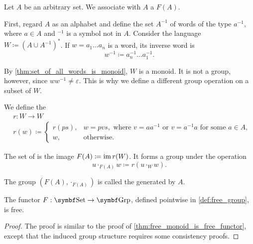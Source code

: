\begin{definition}\label{def:free_group}\cite[306]{Knapp2016BAlg}
  Let \( A \) be an arbitrary set. We associate with \( A \) a  \( F(A) \). 

  First, regard \( A \) as an alphabet and define the set \( A^{-1} \) of words of the type \( a^{-1} \), where \( a \in A \) and \( \mbox{}^{-1} \) is a symbol not in \( A \). Consider the language \( W \coloneqq (A \cup A^{-1})^{*} \). If \( w = a_1 \ldots a_n \) is a word, its inverse word is
  \begin{equation*}
    w^{-1} \coloneqq a_n^{-1} \ldots a_1^{-1}.
  \end{equation*}

  By \cref{thm:set_of_all_words_is_monoid}, \( W \) is a monoid. It is not a group, however, since \( w w^{-1} \neq \varepsilon \). This is why we define a different group operation on a subset of \( W \).

  We define the 
  \begin{align*}
    &r: W \to W \\
    &r(w) \coloneqq \begin{cases}
      r(ps), &w = pvs, \text{ where } v = aa^{-1} \text{ or } v = a^{-1}a \text{ for some } a \in A, \\
      w, &\text{otherwise}.
    \end{cases}
  \end{align*}

  The set of  is the image \( F(A) \coloneqq \operatorname{im} r(W) \). It forms a group under the operation
  \begin{equation*}
    u \cdot_{F(A)} w \coloneqq r(u \cdot_{W} w).
  \end{equation*}

  The group \( (F(A), \cdot_{F(A)}) \) is called the  generated by \( A \).
\end{definition}

\begin{proposition}\label{thm:free_group_is_free_functor}
  The functor \( F: \Cat{Set} \to \Cat{Grp} \), defined pointwise in \cref{def:free_group}, is free.
\end{proposition}
\begin{proof}
  The proof is similar to the proof of \cref{thm:free_monoid_is_free_functor}, except that the induced group structure requires some consistency proofs.
\end{proof}

